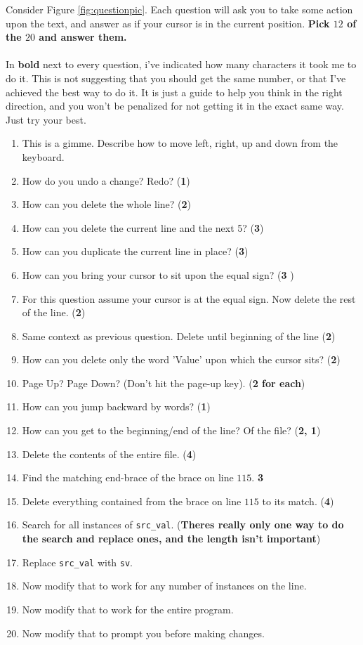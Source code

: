 Consider Figure \ref{fig:questionpic}. Each question will ask you to take some
action upon the text, and answer as if your cursor is in the current position.
{\bf Pick $12$ of the $20$ and answer them.} 
\\\\
In {\bf bold} next to every question, i've indicated how many characters
it took me to do it. This is not suggesting that you should get the same number,
or that I've achieved the best way to do it. It is just a guide to help you
think in the right direction, and you won't be penalized for not getting it
in the exact same way. Just try your best.

\begin{enumerate}
\item This is a gimme. Describe how to move left, right, up and down from the keyboard.
\item How do you undo a change? Redo? ({\bf 1})
\item How can you delete the whole line? ({\bf 2})
\item How can you delete the current line and the next 5? ({\bf 3})
\item How can you duplicate the current line in place? ({\bf 3})
\item How can you bring your cursor to sit upon the equal sign? ({\bf 3 })
\item For this question assume your cursor is at the equal sign. Now delete the rest of the line. ({\bf 2})
\item Same context as previous question. Delete until beginning of the line ({\bf 2})
\item How can you delete only the word 'Value' upon which the cursor sits? ({\bf 2})
\item Page Up? Page Down? (Don't hit the page-up key). ({\bf 2 for each})
\item How can you jump backward by words? ({\bf 1})
\item How can you get to the beginning/end of the line? Of the file? ({\bf 2, 1})
\item Delete the contents of the entire file. ({\bf 4})
\item Find the matching end-brace of the brace on line $115$. {\bf 3}
\item Delete everything contained from the brace on line $115$ to its match. ({\bf 4})
\item Search for all instances of \texttt{src\_val}. ({\bf Theres really only one way to do the search and replace ones, and the length isn't important})
\item Replace \texttt{src\_val} with \texttt{sv}. 
\item Now modify that to work for any number of instances on the line.
\item Now modify that to work for the entire program.
\item Now modify that to prompt you before making changes.

\end{enumerate}

